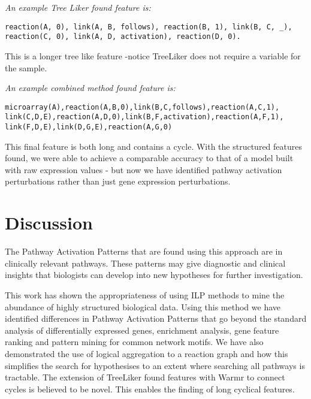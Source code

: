 \documentclass[runningheads,a4paper]{llncs}
\begin{document}
\noindent
{\it{An example Tree Liker found feature is:}}

\begin{verbatim}
reaction(A, 0), link(A, B, follows), reaction(B, 1), link(B, C, _),    
reaction(C, 0), link(A, D, activation), reaction(D, 0).
\end{verbatim}
\noindent 
This is a longer tree like feature -notice TreeLiker does not require a variable for the sample.  
\newline

\noindent
{\it{An example combined method found feature is:}}
\begin{verbatim}
microarray(A),reaction(A,B,0),link(B,C,follows),reaction(A,C,1),
link(C,D,E),reaction(A,D,0),link(B,F,activation),reaction(A,F,1),
link(F,D,E),link(D,G,E),reaction(A,G,0)
\end{verbatim}
\noindent
This final feature is both long and contains a cycle. With the structured features found, we were able to achieve a comparable accuracy to that of a model built with raw expression values - but now we have identified pathway activation perturbations rather than just gene expression perturbations. 

\section{Discussion}
The Pathway Activation Patterns that are found using this approach are in clinically relevant pathways. These patterns may give diagnostic and clinical insights that biologists can develop into new hypotheses for further investigation. 

This work has shown the appropriateness of using ILP methods to mine the abundance of highly structured biological data. Using this method we have identified differences in Pathway Activation Patterns that go beyond the standard analysis of differentially expressed genes, enrichment analysis, gene feature ranking and pattern mining for common network motifs. We have also demonstrated the use of logical aggregation to a  reaction graph and how this simplifies the search for hypothesises to an extent where searching all pathways is tractable. The extension of TreeLiker found features with Warmr to connect cycles is believed to be novel. This enables the finding of long cyclical features. 
\newline





\begingroup
\let\clearpage\relax
{}
\endgroup

%

%
%
\end{document}
